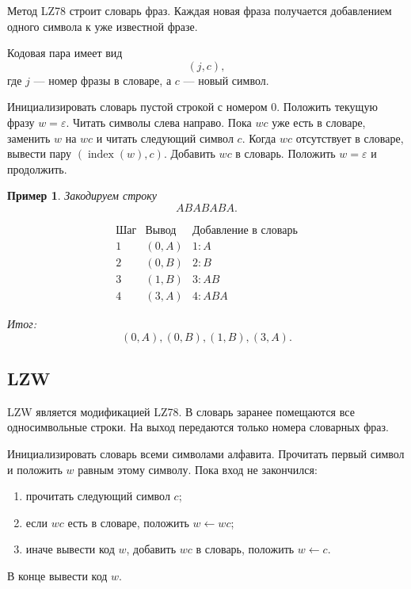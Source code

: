 \documentclass[12pt,a4paper]{article}
\newtheorem{example}{Пример}[section]
\begin{document}
Метод LZ78 строит словарь фраз.
Каждая новая фраза получается добавлением одного символа к уже известной фразе.

Кодовая пара имеет вид
\[
    (j,c),
\]
где $j$ --- номер фразы в словаре, а $c$ --- новый символ.

\begin{algorithm}[H]
\caption{LZ78-кодирование}
\begin{algorithmic}[1]
\STATE Инициализировать словарь пустой строкой с номером $0$.
\STATE Положить текущую фразу $w=\varepsilon$.
\STATE Читать символы слева направо.
\STATE Пока $wc$ уже есть в словаре, заменить $w$ на $wc$ и читать следующий символ $c$.
\STATE Когда $wc$ отсутствует в словаре, вывести пару $(\operatorname{index}(w),c)$.
\STATE Добавить $wc$ в словарь.
\STATE Положить $w=\varepsilon$ и продолжить.
\end{algorithmic}
\end{algorithm}

\begin{example}
Закодируем строку
\[
    ABABABA.
\]

\[
\begin{array}{c|c|c}
\text{Шаг} & \text{Вывод} & \text{Добавление в словарь}\\
\hline
1 & (0,A) & 1:A\\
2 & (0,B) & 2:B\\
3 & (1,B) & 3:AB\\
4 & (3,A) & 4:ABA
\end{array}
\]

Итог:
\[
    (0,A),(0,B),(1,B),(3,A).
\]
\end{example}

\subsection{LZW}

LZW является модификацией LZ78.
В словарь заранее помещаются все односимвольные строки.
На выход передаются только номера словарных фраз.

\begin{algorithm}[H]
\caption{LZW-кодирование}
\begin{algorithmic}[1]
\STATE Инициализировать словарь всеми символами алфавита.
\STATE Прочитать первый символ и положить $w$ равным этому символу.
\STATE Пока вход не закончился:
\begin{enumerate}
    \item прочитать следующий символ $c$;
    \item если $wc$ есть в словаре, положить $w\leftarrow wc$;
    \item иначе вывести код $w$, добавить $wc$ в словарь, положить $w\leftarrow c$.
\end{enumerate}
\STATE В конце вывести код $w$.
\end{algorithmic}
\end{algorithm}
\end{document}

